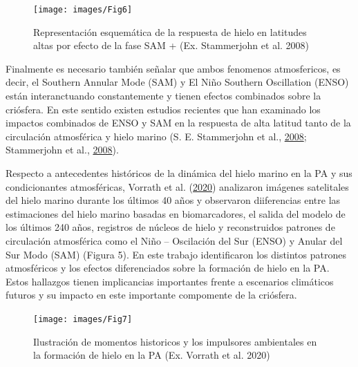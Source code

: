 \documentclass[
]{article}
\begin{document}
\begin{figure}

{\centering \texttt{[image: images/Fig6]} 

}

\caption{Representación esquemática de la respuesta de hielo en latitudes altas por efecto de la fase SAM + (Ex. Stammerjohn et al. 2008)}\label{fig:unnamed-chunk-4}
\end{figure}

Finalmente es necesario también señalar que ambos fenomenos
atmosfericos, es decir, el Southern Annular Mode (SAM) y El Niño
Southern Oscillation (ENSO) están interanctuando constantemente y tienen
efectos combinados sobre la criósfera. En este sentido existen estudios
recientes que han examinado los impactos combinados de ENSO y SAM en la
respuesta de alta latitud tanto de la circulación atmosférica y hielo
marino (S. E. Stammerjohn et al.,
\protect\hyperlink{ref-Stammerjohn2008}{2008}; Stammerjohn et al.,
\protect\hyperlink{ref-Stammerjohn2008a}{2008}).

Respecto a antecedentes históricos de la dinámica del hielo marino en la
PA y sus condicionantes atmosféricas, Vorrath et al.
(\protect\hyperlink{ref-Vorrath2020}{2020}) analizaron imágenes
satelitales del hielo marino durante los últimos 40 años y observaron
diiferencias entre las estimaciones del hielo marino basadas en
biomarcadores, el salida del modelo de los últimos 240 años, registros
de núcleos de hielo y reconstruidos patrones de circulación atmosférica
como el Niño -- Oscilación del Sur (ENSO) y Anular del Sur Modo (SAM)
(Figura 5). En este trabajo identificaron los distintos patrones
atmosféricos y los efectos diferenciados sobre la formación de hielo en
la PA. Estos hallazgos tienen implicancias importantes frente a
escenarios climáticos futuros y su impacto en este importante compomente
de la criósfera.

\begin{figure}

{\centering \texttt{[image: images/Fig7]} 

}

\caption{Ilustración de momentos historicos y los impulsores ambientales en la formación de hielo en la PA (Ex. Vorrath et al. 2020)}\label{fig:unnamed-chunk-5}
\end{figure}

\pagebreak
\end{document}
